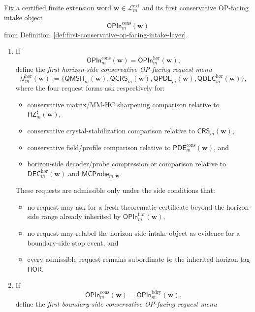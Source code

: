 \begin{definition}
\label{def:first-conservative-op-facing-work-request-contract}
Fix a certified finite extension word \(\mathbf w\in\mathcal L^{\mathrm{ext}}_{m}\) and its first conservative OP-facing intake object
\[
 \mathsf{OPIn}^{\mathrm{cons}}_{m}(\mathbf w)
\]
from Definition~\ref{def:first-conservative-op-facing-intake-layer}.
\begin{enumerate}[label=(\roman*)]
 \item If
 \[
 \mathsf{OPIn}^{\mathrm{cons}}_{m}(\mathbf w)=\mathsf{OPIn}^{\mathrm{hor}}_{m}(\mathbf w),
 \]
 define the \emph{first horizon-side conservative OP-facing request menu}
 \[
 \mathcal Q^{\mathrm{hor}}_{m}(\mathbf w)
 :=
 \{\mathsf{QMSH}_{m}(\mathbf w),\mathsf{QCRS}_{m}(\mathbf w),\mathsf{QPDE}_{m}(\mathbf w),\mathsf{QDEC}^{\mathrm{hor}}_{m}(\mathbf w)\},
 \]
 where the four request forms ask respectively for:
 \begin{itemize}[leftmargin=2em]
 \item conservative matrix/MM-HC sharpening comparison relative to \(\mathsf{HZ}^{\sharp}_{m}(\mathbf w)\),
 \item conservative crystal-stabilization comparison relative to \(\mathsf{CRS}_{m}(\mathbf w)\),
 \item conservative field/profile comparison relative to \(\mathsf{PDE}^{\mathrm{cons}}_{m}(\mathbf w)\), and
 \item horizon-side decoder/probe compression or comparison relative to \(\mathsf{DEC}^{\mathrm{hor}}_{m}(\mathbf w)\) and \(\mathsf{MCProbe}_{m,\mathbf w}\).
 \end{itemize}
 These requests are admissible only under the side conditions that:
 \begin{itemize}[leftmargin=2em]
 \item no request may ask for a fresh theorematic certificate beyond the horizon-side range already inherited by \(\mathsf{OPIn}^{\mathrm{hor}}_{m}(\mathbf w)\),
 \item no request may relabel the horizon-side intake object as evidence for a boundary-side stop event, and
 \item every admissible request remains subordinate to the inherited horizon tag \(\mathsf{HOR}\).
 \end{itemize}
 \item If
 \[
 \mathsf{OPIn}^{\mathrm{cons}}_{m}(\mathbf w)=\mathsf{OPIn}^{\mathrm{bdry}}_{m}(\mathbf w),
 \]
 define the \emph{first boundary-side conservative OP-facing request menu}

\end{enumerate}
\end{definition}
